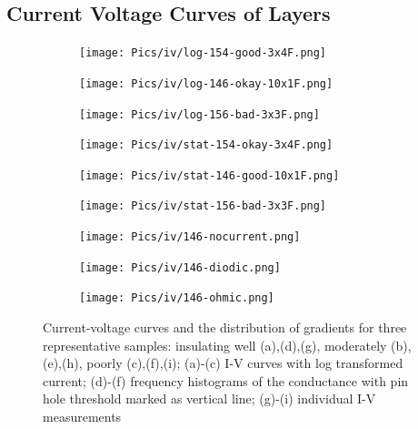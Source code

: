 \subsection{Current Voltage Curves of  Layers} 
\begin{figure}
    \centering
    \begin{subfigure}{.32\textwidth}
        \texttt{[image: Pics/iv/log-154-good-3x4F.png]}
		\caption{}%
		\label{fig:iv-log-good}
    \end{subfigure}
    \begin{subfigure}{.32\textwidth}
        \texttt{[image: Pics/iv/log-146-okay-10x1F.png]}
		\caption{}%
		\label{fig:iv-log-okay}
    \end{subfigure}
    \begin{subfigure}{.32\textwidth}
        \texttt{[image: Pics/iv/log-156-bad-3x3F.png]}
		\caption{}%
		\label{fig:iv-log-bad}
    \end{subfigure}
    \begin{subfigure}{.32\textwidth}
        \texttt{[image: Pics/iv/stat-154-okay-3x4F.png]}
		\caption{}%
		\label{fig:iv-stat-good}
    \end{subfigure}
    \begin{subfigure}{.32\textwidth}
        \texttt{[image: Pics/iv/stat-146-good-10x1F.png]}
		\caption{}%
		\label{fig:iv-stat-okay}
    \end{subfigure}
    \begin{subfigure}{.32\textwidth}
        \texttt{[image: Pics/iv/stat-156-bad-3x3F.png]}
		\caption{}%
		\label{fig:iv-stat-bad}
    \end{subfigure}
    \begin{subfigure}{.32\textwidth}
        \texttt{[image: Pics/iv/146-nocurrent.png]}
		\caption{}%
		\label{fig:iv-nocurrent}
    \end{subfigure}
    \begin{subfigure}{.32\textwidth}
        \texttt{[image: Pics/iv/146-diodic.png]}
		\caption{}%
		\label{fig:iv-diodic}
    \end{subfigure}
    \begin{subfigure}{.32\textwidth}
        \texttt{[image: Pics/iv/146-ohmic.png]}
		\caption{}%
		\label{fig:iv-ohmic}
    \end{subfigure}
	\caption{
		Current-voltage curves and the distribution of gradients for three representative samples: insulating well (a),(d),(g), moderately (b),(e),(h), poorly (c),(f),(i); 
		(a)-(c) I-V curves with log transformed current; 
		(d)-(f) frequency histograms of the conductance with pin hole threshold marked as vertical line; 
		(g)-(i) individual I-V measurements
	}
    \label{fig:iv}
\end{figure}

